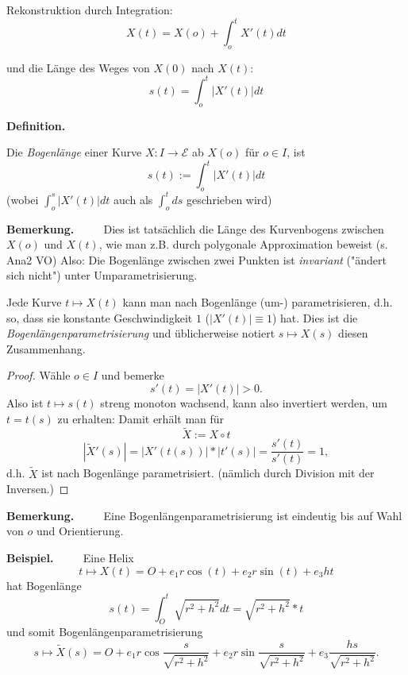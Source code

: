 \documentclass[a4paper,oneside,11pt,DIV=12,parskip=half]{scrartcl}
\newenvironment{definition}{\textbf{Definition.} ~~~~}{}
\newenvironment{note}{\textbf{Bemerkung.} ~~~~}{}
\newenvironment{example}{\textbf{Beispiel.} ~~~~}{}
\newenvironment{lemma, definition}{\textbf{Lemma und Definition.} ~~~~}{}
\newenvironment{note, example}{\textbf{Bemerkung und Beispiel.} ~~~~}{}
\newenvironment{note, definition}{\textbf{Bemerkung und Definition.} ~~~~}{}
\begin{document}
Rekonstruktion durch Integration:
\[X(t)= X(o) + \int_{o}^{t}X'(t)dt\]

und die Länge des Weges von $X(0)$ nach $X(t)$:
\[s(t) = \int_{o}^{t}|X'(t)|dt\]

\begin{definition}
	
	Die \textit{Bogenlänge} einer Kurve $X: I \rightarrow \mathcal{E}$ ab $X(o)$ für $o \in I$, ist
	\[s(t) := \int_{o}^{t}|X'(t)|dt\] (wobei $\int_{o}^{s}|X'(t)|dt$ auch als $\int_{o}^{t} ds$ geschrieben wird)
	
\end{definition}

\begin{note}
	Dies ist tatsächlich die Länge des Kurvenbogens zwischen $X(o)$ und $X(t)$, wie man z.B. durch polygonale Approximation beweist (s. Ana2 VO)
	Also: Die Bogenlänge zwischen zwei Punkten ist \textit{invariant} ("ändert sich nicht")
	unter Umparametrisierung.
\end{note}

\begin{lemma, definition}
	Jede Kurve $t \mapsto X(t)$ kann man nach Bogenlänge (um-) parametrisieren, d.h. so, dass sie konstante Geschwindigkeit $1$ ($|X'(t)|\equiv 1$) hat.
	Dies ist die \textit{Bogenlängenparametrisierung} und üblicherweise notiert $s \mapsto X(s)$ diesen Zusammenhang.
\end{lemma, definition}
\begin{proof}
	Wähle $o \in I$ und bemerke \[s'(t) = |X'(t)| > 0.\]
	Also ist $t \mapsto s(t)$ streng monoton wachsend, kann also invertiert werden, um $t= t(s)$ zu erhalten: Damit erhält man für 
	\[\widetilde{X}:=X\circ t\]
	\[|\widetilde{X}'(s)|= |X'(t(s))|*|t'(s)| = \frac{s'(t)}{s'(t)}= 1,\]
	d.h. $\widetilde{X}$ ist nach Bogenlänge parametrisiert. (nämlich durch Division mit der Inversen.)
\end{proof}

\begin{note}
	Eine Bogenlängenparametrisierung ist eindeutig bis auf Wahl von $o$ und Orientierung.
\end{note}

\begin{example}
	Eine Helix \[t \mapsto X(t) = O + e_1r\cos(t)+e_2r\sin(t)+ e_3ht\]
	hat Bogenlänge \[s(t) = \int_{O}^{t} \sqrt{r^2 + h^2}dt = \sqrt{r^2+h^2}*t\]
	und somit Bogenlängenparametrisierung \[s \mapsto \widetilde{X}(s)= O + e_1r\cos\frac{s}{\sqrt{r^2+h^2}}+e_2r\sin\frac{s}{\sqrt{r^2+h^2}}+ e_3\frac{hs}{\sqrt{r^2+h^2}}.\]
\end{example}
\end{document}
